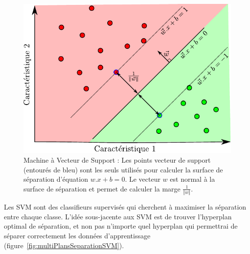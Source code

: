\begin{figure}[h]
	\begin{center}
	\includegraphics[width=12cm]{images/SVM}
	\end{center}
	\caption[Machine à Vecteur de Support]{Machine à Vecteur de Support : Les points vecteur de support (entourés de bleu) sont les seuls utilisés pour calculer la surface de séparation d'équation $w . x + b = 0$. Le vecteur $w$ est normal à la surface de séparation et permet de calculer la marge $\frac{1}{\Vert w \Vert}$.}
	\label{fig:SVM}
\end{figure}


Les SVM sont des classifieurs supervisés qui cherchent à maximiser la séparation entre chaque classe. L'idée sous-jacente aux SVM est de trouver l'hyperplan optimal de séparation, et non pas n'importe quel hyperplan qui permettrai de séparer correctement les données d'apprentissage (figure~\ref{fig:multiPlansSeparationSVM}). 


